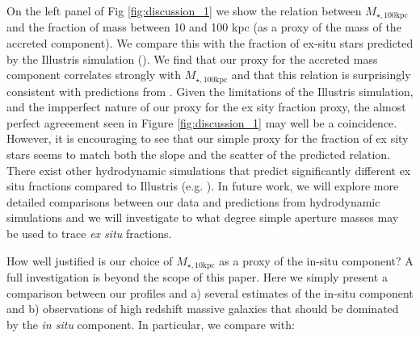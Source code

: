\documentclass[a4paper,fleqn,usenatbib]{mnras}
\def\rbcg{\texttt{cenHighMh}}
\def\nbcg{\texttt{cenLowMh}}
\def\mstar{{$M_{\star}$}}
\def\mhalo{{$M_{\mathrm{halo}}$}}
\def\logms{{$\log (M_{\star}/M_{\odot})$}}
\def\minn{{$M_{\star,10\mathrm{kpc}}$}}
\def\mtot{{$M_{\star,100\mathrm{kpc}}$}}
\def\mden{{$\mu_{\star}$}}
\begin{document}
    On the left panel of Fig \ref{fig:discussion_1} we show the relation between \mtot{} and the fraction of mass between 10 and 100 kpc (as a proxy of the mass of the accreted component). We compare this with the  fraction of ex-situ stars predicted by the Illustris simulation 
    (\citealt{RodriguezGomez2016}).  We find that  our proxy for the accreted mass component correlates strongly with  \mtot{} and that this relation is surprisingly consistent with predictions from \citet{RodriguezGomez2016}.  Given the limitations of the Illustris simulation, and the impperfect nature of our proxy for the ex sity fraction proxy, the almost perfect agreeement seen in Figure \ref{fig:discussion_1} may well be a coincidence.  However, it is encouraging to see that our simple proxy for the fraction of ex sity stars seems to match both the slope and the scatter of the predicted relation.  There exist other  hydrodynamic simulations that predict significantly different ex situ fractions compared to Illustris (e.g. 
    \citealt{Lackner2012, Qu2017}).  In future work, we will explore more detailed comparisons between our data and predictions from hydrodynamic simulations and we will  investigate to what degree simple aperture masses may be used to  trace \textit{ex situ} fractions. 
    
   
   How well justified is our choice of  \minn{} as a proxy of the  in-situ component?  A full investigation is beyond the scope of this paper. Here we simply present a comparison  between our profiles and  a)  several estimates of the in-situ component and b) observations of high redshift massive galaxies that should be dominated by the  \textit{in situ} component.  In particular, we compare with:
  
\end{document}
